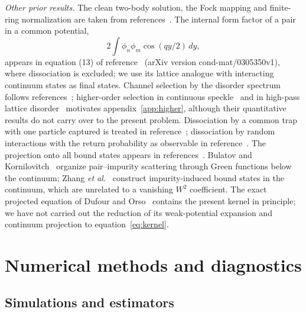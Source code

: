 \documentclass[12pt,a4paper]{article}
\theoremstyle{remark}
\begin{document}
\emph{Other prior results.} The clean two-body solution, the Fock mapping and finite-ring normalization are taken from references~\cite{ValientePetrosyan2008,Javanainen2010}. The internal form factor of a pair in a common potential,
\[
2\int\phi_n\phi_m\cos(qy/2)\,dy,
\]
appears in equation (13) of reference~\cite{TurekJohn2003} (arXiv version cond-mat/0305350v1), where dissociation is excluded; we use its lattice analogue with interacting continuum states as final states. Channel selection by the disorder spectrum follows references~\cite{IzrailevMakarov2003,IzrailevMakarov2004}; higher-order selection in continuous speckle~\cite{Lugan2009,GurevichKenneth2009} and in high-pass lattice disorder~\cite{Vanoni2026} motivates appendix~\ref{app:higher}, although their quantitative results do not carry over to the present problem. Dissociation by a common trap with one particle captured is treated in reference~\cite{MaksimovKolovsky2014}; dissociation by random interactions with the return probability as observable in reference~\cite{Perrin2021}. The projection onto all bound states appears in references~\cite{Boschi2014,Bello2017}. Bulatov and Kornilovitch~\cite{BulatovKornilovitch2005} organize pair--impurity scattering through Green functions below the continuum; Zhang \emph{et al.}~\cite{ZhangBraakKollar2012} construct impurity-induced bound states in the continuum, which are unrelated to a vanishing $W^2$ coefficient. The exact projected equation of Dufour and Orso~\cite{DufourOrso2012} contains the present kernel in principle; we have not carried out the reduction of its weak-potential expansion and continuum projection to equation~\eqref{eq:kernel}.

\section{Numerical methods and diagnostics}\label{app:numerics}

\subsection{Simulations and estimators}
\end{document}
